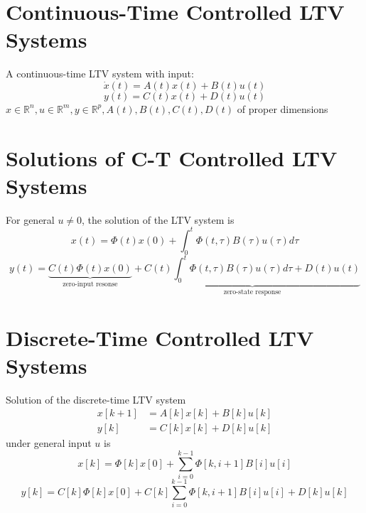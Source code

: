 \documentclass[10pt,a4paper,oneside]{article}
\begin{document}
\section{Continuous-Time Controlled LTV Systems}
A continuous-time LTV system with input:
\[
\dot{x}(t)=A(t) x(t)+B(t) u(t)
\]
\[
y(t)=C(t) x(t)+D(t) u(t)
\]
$x \in \mathbb{R}^{n}, u \in \mathbb{R}^{m}, y \in \mathbb{R}^{p}, A(t), B(t), C(t), D(t)$ of proper dimensions
\section{Solutions of C-T Controlled LTV Systems}
For general $u\neq0$, the solution of the LTV system is
\[
x(t)=\Phi(t) x(0)+\int_{0}^{t} \Phi(t, \tau) B(\tau) u(\tau) d \tau
\]
\[
y(t)=\underbrace{C(t) \Phi(t) x(0)}_{\text { zero-input resonse }}+\underbrace{C(t) \int_{0}^{t} \Phi(t, \tau) B(\tau) u(\tau) d \tau+D(t) u(t)}_{\text { zero-state response }}
\]
\section{Discrete-Time Controlled LTV Systems}
Solution of the discrete-time LTV system
\[
\begin{aligned} x[k+1] &=A[k] x[k]+B[k] u[k] \\ y[k] &=C[k] x[k]+D[k] u[k] \end{aligned}
\]
under general input $u$ is
\[
x[k]=\Phi[k] x[0]+\sum_{i=0}^{k-1} \Phi[k, i+1] B[i] u[i]
\]
\[
y[k]=C[k] \Phi[k] x[0]+C[k] \sum_{i=0}^{k-1} \Phi[k, i+1] B[i] u[i]+D[k] u[k]
\]
\end{document}
